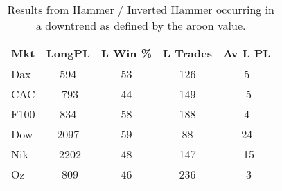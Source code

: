 \begin{table}[ht]
\centering
\caption[Hammer System in downtrend.]{Results from Hammer / Inverted Hammer occurring in a downtrend as defined by the aroon value.} 
\label{tab:hammer_aroon_results}
\begin{tabular}{lcccc}
  \toprule Mkt & LongPL & L Win \% & L Trades & Av L PL \\ 
  \midrule Dax & 594 & 53 & 126 & 5 \\ 
  CAC & -793 & 44 & 149 & -5 \\ 
  F100 & 834 & 58 & 188 & 4 \\ 
  Dow & 2097 & 59 & 88 & 24 \\ 
  Nik & -2202 & 48 & 147 & -15 \\ 
  Oz & -809 & 46 & 236 & -3 \\ 
   \bottomrule \end{tabular}
\end{table}
